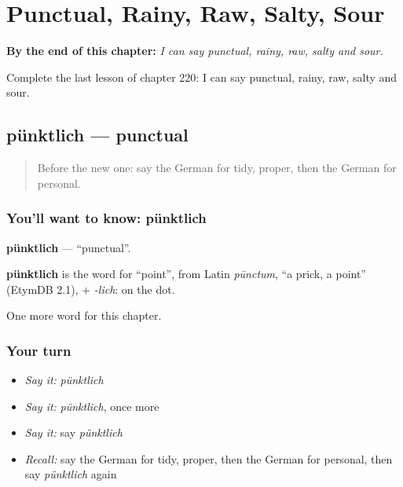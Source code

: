 
\chapter{Punctual, Rainy, Raw, Salty, Sour}
\label{ch:ge-punctual-rainy-raw-salty-sour}

\begin{chapteropening}
\textbf{By the end of this chapter:} \emph{I can say punctual, rainy, raw, salty and sour.}

Complete the last lesson of chapter 220: I can say punctual, rainy, raw, salty and sour.
\end{chapteropening}

\section[pünktlich]{pünktlich — punctual}

\label{lesson:GE-C220-puenktlich}



\begin{quote}
Before the new one: say the German for tidy, proper, then the German for personal.
\end{quote}

\subsection*{You'll want to know: pünktlich}
\textbf{pünktlich} — \textquotedblleft{}punctual\textquotedblright{}.

\begin{cousinweb}
\textbf{pünktlich} is the word for \textquotedblleft{}point\textquotedblright{}, from Latin \emph{pūnctum}, \textquotedblleft{}a prick, a point\textquotedblright{} (EtymDB 2.1), + \emph{-lich}: on the dot.
\end{cousinweb}

\begin{grammarlens}[title={What you've built}]
One more word for this chapter.
\end{grammarlens}

\subsection*{Your turn}
\begin{itemize}
\raggedright
  \item \emph{Say it:} \emph{pünktlich}
  \item \emph{Say it:} \emph{pünktlich}, once more
  \item \emph{Say it:} say \emph{pünktlich}
  \item \emph{Recall:} say the German for tidy, proper, then the German for personal, then say \emph{pünktlich} again
\end{itemize}

